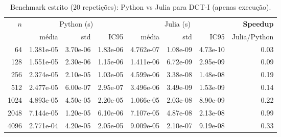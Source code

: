 
\begin{table}[h!]\centering
\caption{Benchmark estrito (20 repetições): Python vs Julia para DCT-I (apenas execução).}
\label{tab:bench_python_julia_strict}
\begin{tabular}{rrrrrrrr}
\toprule
$n$ & \multicolumn{3}{c}{Python (s)} & \multicolumn{3}{c}{Julia (s)} & \textbf{Speedup} \\
\cmidrule(lr){2-4} \cmidrule(lr){5-7}
    & média & std & IC95 & média & std & IC95 & Julia/Python \\
\midrule
64 & 1.381e-05 & 3.70e-06 & 1.83e-06 & 4.762e-07 & 1.08e-09 & 4.73e-10 & 0.03 \\
128 & 1.551e-05 & 2.30e-06 & 1.15e-06 & 1.411e-06 & 6.72e-09 & 2.95e-09 & 0.09 \\
256 & 2.374e-05 & 2.10e-05 & 1.03e-05 & 4.599e-06 & 3.38e-08 & 1.48e-08 & 0.19 \\
512 & 2.477e-05 & 6.00e-07 & 2.95e-07 & 3.496e-06 & 3.49e-09 & 1.53e-09 & 0.14 \\
1024 & 4.893e-05 & 4.50e-05 & 2.20e-05 & 1.066e-05 & 2.03e-08 & 8.90e-09 & 0.22 \\
2048 & 7.144e-05 & 1.20e-05 & 6.10e-06 & 7.107e-05 & 4.87e-08 & 2.13e-08 & 0.99 \\
4096 & 2.771e-04 & 4.20e-05 & 2.05e-05 & 9.009e-05 & 2.10e-07 & 9.19e-08 & 0.33 \\
\bottomrule
    \end{tabular}
    \end{table}
